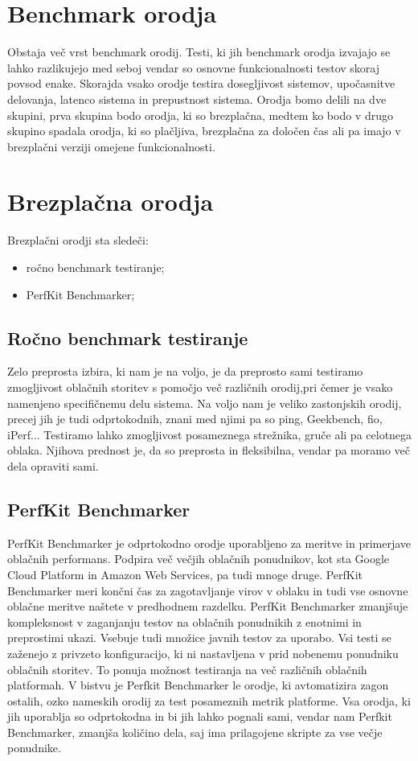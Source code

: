 \section{Benchmark orodja}
Obstaja več vrst benchmark orodij. Testi, ki jih benchmark orodja izvajajo se lahko razlikujejo med seboj vendar so osnovne funkcionalnosti testov skoraj povsod enake. Skorajda vsako orodje testira dosegljivost sistemov, upočasnitve delovanja, latenco sistema in prepustnost sistema. Orodja bomo delili na dve skupini, prva skupina bodo orodja, ki so brezplačna, medtem ko bodo v drugo skupino spadala orodja, ki so plačljiva, brezplačna za določen čas ali pa imajo v brezplačni verziji omejene funkcionalnosti.

\section{Brezplačna orodja}
Brezplačni orodji sta sledeči:
\begin{itemize}
\item ročno benchmark testiranje;
\item PerfKit Benchmarker;
\end{itemize}

\subsection{Ročno benchmark testiranje}
Zelo preprosta izbira, ki nam je na voljo, je da preprosto sami testiramo zmogljivost oblačnih storitev s pomočjo več različnih orodij,pri čemer je vsako namenjeno specifičnemu delu sistema. Na voljo nam je veliko zastonjskih orodij, precej jih je tudi odprtokodnih, znani med njimi pa so ping, Geekbench, fio, iPerf... Testiramo lahko zmogljivost posameznega strežnika, gruče ali pa celotnega oblaka. Njihova prednost je, da so preprosta in fleksibilna, vendar pa moramo več dela opraviti sami.

\subsection{PerfKit Benchmarker}
PerfKit Benchmarker je odprtokodno orodje uporabljeno za meritve in primerjave oblačnih performans.
Podpira več večjih oblačnih ponudnikov, kot sta Google Cloud Platform in Amazon Web Services, pa tudi mnoge druge.
PerfKit Benchmarker meri končni čas za zagotavljanje virov v oblaku in tudi vse osnovne oblačne meritve naštete v predhodnem razdelku. PerfKit Benchmarker zmanjšuje kompleksnost v zaganjanju testov na oblačnih ponudnikih z enotnimi in preprostimi ukazi.
Vsebuje tudi množice javnih testov za uporabo. Vsi testi se zaženejo z privzeto konfiguracijo, ki ni nastavljena v prid nobenemu ponudniku oblačnih storitev. To ponuja možnost testiranja na več različnih oblačnih platformah.
V bistvu je Perfkit Benchmarker le orodje, ki avtomatizira zagon ostalih, ozko nameskih orodij za test posameznih metrik platforme. Vsa orodja, ki jih uporablja so odprtokodna in bi jih lahko pognali sami, vendar nam Perfkit Benchmarker, zmanjša količino dela, saj ima prilagojene skripte za vse večje ponudnike.

